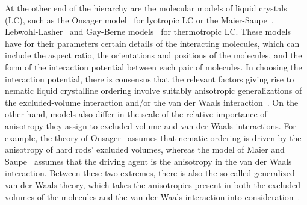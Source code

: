 \documentclass[jcp,aps,twocolumn,showpacs,supergroupedaddress,epsfig,amsmath,amssymb,eqsecnum]{revtex4}
\begin{document}
At the other end of the hierarchy are the molecular models of liquid crystals (LC), such as the Onsager model~\cite{onsager1949,han2015} for lyotropic LC or the Maier-Saupe~\cite{maier-saupe1958,maier-saupe1959,maier-saupe1960}, Lebwohl-Lasher~\cite{lebwohl-lasher1972,pasini2000a,pasini2000b} and Gay-Berne models~\cite{gay-berne1981,berardi1995,berardi1998} for thermotropic LC. These models have for their parameters certain details of the interacting molecules, which can include the aspect ratio, the orientations and positions of the molecules, and the form of the interaction potential between each pair of molecules. In choosing the interaction potential, there is consensus that the relevant factors giving rise to nematic liquid crystalline ordering involve suitably anisotropic generalizations of the excluded-volume interaction and/or the van der Waals interaction~\cite{gelbart-baron1977,cotter1977}. On the other hand, models also differ in the scale of the relative importance of anisotropy they assign to excluded-volume and van der Waals interactions. For example, the theory of Onsager~\cite{onsager1949} assumes that nematic ordering is  driven by the anisotropy of hard rods' excluded volumes, whereas the model of Maier and Saupe~\cite{maier-saupe1958,maier-saupe1959,maier-saupe1960} assumes that the driving agent is the anisotropy in the van der Waals interaction. Between these two extremes, there is also the so-called generalized van der Waals theory, which takes the anisotropies present in both the excluded volumes of the molecules and the van der Waals interaction into consideration~\cite{gelbart-baron1977,cotter1977}. 
\end{document}
